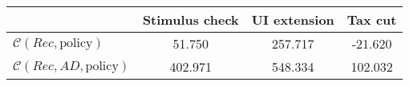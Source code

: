 \begin{tabular}{@{}lccc@{}} 
\toprule 
                          & Stimulus check      & UI extension    & Tax cut    \\  \midrule 
$\mathcal{C}(Rec,\text{policy})$ & 51.750  & 257.717  & -21.620     \\ 
$\mathcal{C}(Rec, AD,\text{policy})$ & 402.971  & 548.334  & 102.032     \\ 
\end{tabular}  
